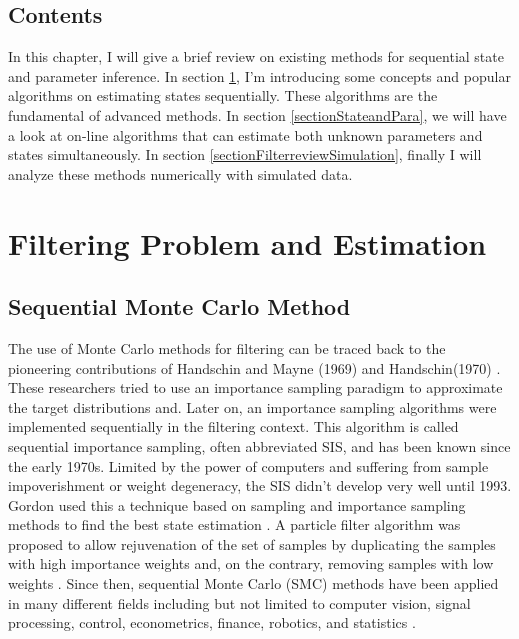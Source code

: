 \subsection*{Contents}

In this chapter, I will give a brief review on existing methods for sequential state and parameter inference. In section \ref{sectionFiltering}, I'm introducing some concepts and popular algorithms on estimating states sequentially. These algorithms are the fundamental of advanced methods. In section \ref{sectionStateandPara}, we will have a look at on-line algorithms that can estimate both unknown parameters and states simultaneously. In section \ref{sectionFilterreviewSimulation}, finally I will analyze these methods numerically with simulated data. 




\section{Filtering Problem and Estimation}\label{sectionFiltering}


\subsection{Sequential Monte Carlo Method}

The use of Monte Carlo methods for filtering can be traced back to the pioneering contributions of Handschin and Mayne (1969) \cite{handschin1969monte} and Handschin(1970) \cite{handschin1970monte}. These researchers tried to use an importance sampling paradigm to approximate the target distributions and. Later on, an importance sampling algorithms were implemented sequentially in the filtering context. This algorithm is called sequential importance sampling, often abbreviated SIS, and has been known since the early 1970s. Limited by the power of computers and  suffering from sample impoverishment or weight degeneracy, the SIS didn't develop very well until 1993. Gordon used this a technique based on sampling and importance sampling methods to find the best state estimation  \cite{gordon1993novel}. A particle filter algorithm was proposed to allow rejuvenation of the set of samples by duplicating the samples with high importance weights and, on the contrary, removing samples with low weights \cite{cappe2009inference}. Since then, sequential Monte Carlo (SMC) methods have been applied in many different fields including but not limited to computer vision, signal processing, control, econometrics, finance, robotics, and statistics \cite{smcmip2011}  \cite{ristic2004beyond}.

